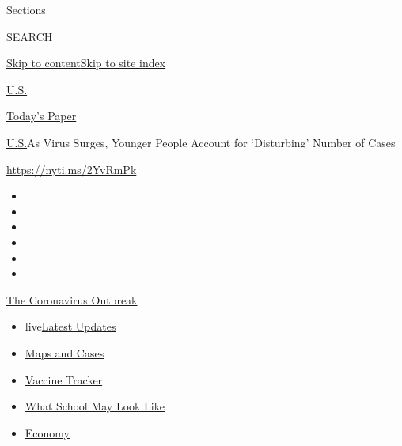 Sections

SEARCH

\protect\hyperlink{site-content}{Skip to
content}\protect\hyperlink{site-index}{Skip to site index}

\href{https://www.nytimes.com/section/us}{U.S.}

\href{https://myaccount.nytimes.com/auth/login?response_type=cookie\&client_id=vi}{}

\href{https://www.nytimes.com/section/todayspaper}{Today's Paper}

\href{/section/us}{U.S.}\textbar{}As Virus Surges, Younger People
Account for `Disturbing' Number of Cases

\url{https://nyti.ms/2YvRmPk}

\begin{itemize}
\item
\item
\item
\item
\item
\item
\end{itemize}

\href{https://www.nytimes.com/news-event/coronavirus?action=click\&pgtype=Article\&state=default\&region=TOP_BANNER\&context=storylines_menu}{The
Coronavirus Outbreak}

\begin{itemize}
\tightlist
\item
  live\href{https://www.nytimes.com/2020/08/01/world/coronavirus-covid-19.html?action=click\&pgtype=Article\&state=default\&region=TOP_BANNER\&context=storylines_menu}{Latest
  Updates}
\item
  \href{https://www.nytimes.com/interactive/2020/us/coronavirus-us-cases.html?action=click\&pgtype=Article\&state=default\&region=TOP_BANNER\&context=storylines_menu}{Maps
  and Cases}
\item
  \href{https://www.nytimes.com/interactive/2020/science/coronavirus-vaccine-tracker.html?action=click\&pgtype=Article\&state=default\&region=TOP_BANNER\&context=storylines_menu}{Vaccine
  Tracker}
\item
  \href{https://www.nytimes.com/interactive/2020/07/29/us/schools-reopening-coronavirus.html?action=click\&pgtype=Article\&state=default\&region=TOP_BANNER\&context=storylines_menu}{What
  School May Look Like}
\item
  \href{https://www.nytimes.com/live/2020/07/31/business/stock-market-today-coronavirus?action=click\&pgtype=Article\&state=default\&region=TOP_BANNER\&context=storylines_menu}{Economy}
\end{itemize}

